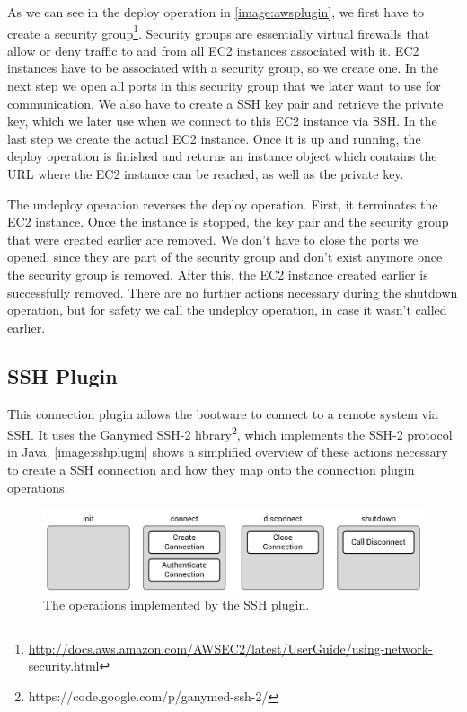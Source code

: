 As we can see in the deploy operation in \autoref{image:awsplugin}, we first have to create a security group\footnote{\url{http://docs.aws.amazon.com/AWSEC2/latest/UserGuide/using-network-security.html}}.
Security groups are essentially virtual firewalls that allow or deny traffic to and from all EC2 instances associated with it.
EC2 instances have to be associated with a security group, so we create one.
In the next step we open all ports in this security group that we later want to use for communication.
We also have to create a SSH key pair and retrieve the private key, which we later use when we connect to this EC2 instance via SSH.
In the last step we create the actual EC2 instance.
Once it is up and running, the deploy operation is finished and returns an instance object which contains the URL where the EC2 instance can be reached, as well as the private key.

The undeploy operation reverses the deploy operation.
First, it terminates the EC2 instance.
Once the instance is stopped, the key pair and the security group that were created earlier are removed.
We don't have to close the ports we opened, since they are part of the security group and don't exist anymore once the security group is removed.
After this, the EC2 instance created earlier is successfully removed.
There are no further actions necessary during the shutdown operation, but for safety we call the undeploy operation, in case it wasn't called earlier.

\subsection{SSH Plugin}

This connection plugin allows the bootware to connect to a remote system via SSH.
It uses the Ganymed SSH-2 library\footnote{https://code.google.com/p/ganymed-ssh-2/}, which implements the SSH-2 protocol in Java.
\autoref{image:sshplugin} shows a simplified overview of these actions necessary to create a SSH connection and how they map onto the connection plugin operations.

\begin{figure}[!htbp]
	\centering
	\includegraphics[resolution=600]{implementation/assets/ssh_plugin}
	\caption{The operations implemented by the SSH plugin.}
	\label{image:sshplugin}
\end{figure}


